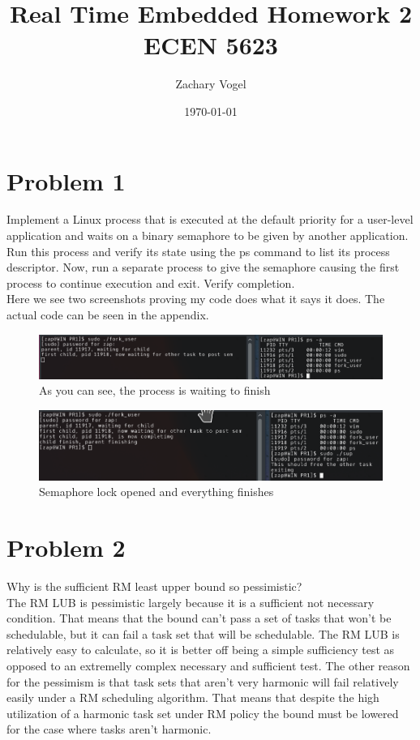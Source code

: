 \documentclass{article}
\author{Zachary Vogel}
\title{Real Time Embedded Homework 2\\ ECEN 5623}
\date{\today}
\begin{document}
\maketitle


\section*{Problem 1}
Implement a Linux process that is executed at the default priority for a user-level application and waits on a binary semaphore to be given by another application. Run this process and verify its state using the ps command to list its process descriptor. Now, run a separate process to give the semaphore causing the first process to continue execution and exit. Verify completion.\\

Here we see two screenshots proving my code does what it says it does. The actual code can be seen in the appendix.
\begin{figure}[H]
    \centering
    \includegraphics[width=\textwidth]{PR1/PR1_part1.png}
    \caption{As you can see, the process is waiting to finish}
\end{figure}
\begin{figure}[H]
    \centering
    \includegraphics[width=\textwidth]{PR1/PR1_part2.png}
    \caption{Semaphore lock opened and everything finishes}
\end{figure}
\section*{Problem 2}
Why is the sufficient RM least upper bound so pessimistic?\\

The RM LUB is pessimistic largely because it is a sufficient not necessary condition. That means that the bound can't pass a set of tasks that won't be schedulable, but it can fail a task set that will be schedulable. The RM LUB is relatively easy to calculate, so it is better off being a simple sufficiency test as opposed to an extremelly complex necessary and sufficient test. The other reason for the pessimism is that task sets that aren't very harmonic will fail relatively easily
under a RM scheduling algorithm. That means that despite the high utilization of a harmonic task set under RM policy the bound must be lowered for the case where tasks aren't harmonic.
\end{document}
